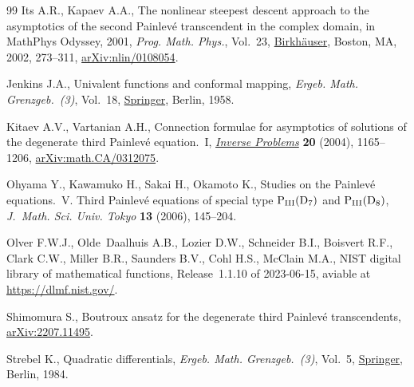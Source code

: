 \documentclass[pdftex]{sigma}
\numberwithin{equation}{section}
\begin{document}
\begin{thebibliography}{99}
Its A.R., Kapaev A.A., The nonlinear steepest descent approach to the
 asymptotics of the second {P}ainlev\'e transcendent in the complex domain, in
 Math{P}hys Odyssey, 2001, \textit{Prog. Math. Phys.}, Vol.~23, \href{https://doi.org/10.1007/978-1-4612-0087-1_10}{Birkh\"auser},
 Boston, MA, 2002, 273--311, \href{https://arxiv.org/abs/nlin/0108054}{arXiv:nlin/0108054}.

Jenkins J.A., Univalent functions and conformal mapping, \textit{Ergeb. Math.
 Grenzgeb.~(3)}, Vol.~18, \href{https://doi.org/10.1007/978-3-662-34447-7}{Springer}, Berlin, 1958.

Kitaev A.V., Vartanian A.H., Connection formulae for asymptotics of solutions
 of the degenerate third {P}ainlev\'e equation.~{I}, \href{https://doi.org/10.1088/0266-5611/20/4/010}{\textit{Inverse Problems}}
 \textbf{20} (2004), 1165--1206, \href{https://arxiv.org/abs/#2}{arXiv:math.CA/0312075}.

Ohyama Y., Kawamuko H., Sakai H., Okamoto K., Studies on the {P}ainlev\'e
 equations.~{V}. {T}hird {P}ainlev\'e equations of special type {${\rm P}_{\rm
 III}({\rm D}_7)$} and {${\rm P}_{\rm III}({\rm D}_8)$}, \textit{J.~Math. Sci.
 Univ. Tokyo} \textbf{13} (2006), 145--204.

Olver F.W.J., Olde~Daalhuis A.B., Lozier D.W., Schneider B.I., Boisvert R.F.,
 Clark C.W., Miller B.R., Saunders B.V., Cohl H.S., McClain M.A., NIST digital
 library of mathematical functions, {R}elease~1.1.10 of 2023-06-15, aviable at
 \url{https://dlmf.nist.gov/}.

Shimomura S., Boutroux ansatz for the degenerate third {P}ainlev\'e
 transcendents, \href{https://arxiv.org/abs/2207.11495}{arXiv:2207.11495}.

Strebel K., Quadratic differentials, \textit{Ergeb. Math. Grenzgeb.~(3)},
 Vol.~5, \href{https://doi.org/10.1007/978-3-662-02414-0}{Springer}, Berlin, 1984.

\end{thebibliography}\LastPageEnding
\end{document}

